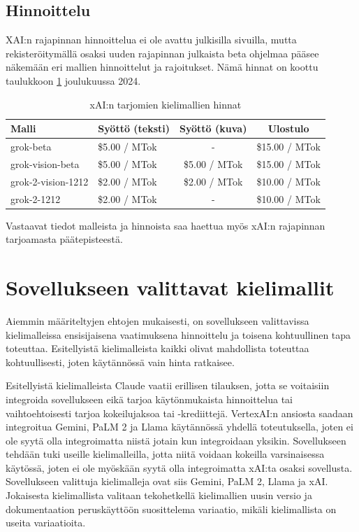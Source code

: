 \subsection{Hinnoittelu}

XAI:n rajapinnan hinnoittelua ei ole avattu julkisilla sivuilla, mutta
rekisteröitymällä osaksi uuden rajapinnan julkaista beta ohjelmaa pääsee
näkemään eri mallien hinnoittelut ja rajoitukset. Nämä hinnat on koottu
taulukkoon \ref{tab:grok-prices} joulukuussa 2024.

\begin{table}[H]
    \centering
    \caption{xAI:n tarjomien kielimallien hinnat}
    \label{tab:grok-prices}
    \begin{tabular}{llcc}
        \textbf{Malli} & \textbf{Syöttö (teksti)} & \textbf{Syöttö (kuva)} & \textbf{Ulostulo} \\
        \hline
        grok-beta          & \$5.00 / MTok &             - & \$15.00 / MTok \\
        grok-vision-beta   & \$5.00 / MTok & \$5.00 / MTok & \$15.00 / MTok \\
        grok-2-vision-1212 & \$2.00 / MTok & \$2.00 / MTok & \$10.00 / MTok \\
        grok-2-1212        & \$2.00 / MTok &             - & \$10.00 / MTok \\
        \hline
    \end{tabular}
\end{table}

Vastaavat tiedot malleista ja hinnoista saa haettua myös xAI:n rajapinnan
tarjoamasta päätepisteestä. \parencite{xAIDocsEndpoints}

\section{Sovellukseen valittavat kielimallit}

Aiemmin määriteltyjen ehtojen mukaisesti, on sovellukseen valittavissa
kielimalleissa ensisijaisena vaatimuksena hinnoittelu ja toisena kohtuullinen
tapa toteuttaa. Esitellyistä kielimalleista kaikki olivat mahdollista toteuttaa
kohtuullisesti, joten käytännössä vain hinta ratkaisee.

Esitellyistä kielimalleista Claude vaatii erillisen tilauksen, jotta se
voitaisiin integroida sovellukseen eikä tarjoa käytönmukaista hinnoittelua tai
vaihtoehtoisesti tarjoa kokeilujaksoa tai -krediittejä. VertexAI:n ansiosta
saadaan integroitua Gemini, PaLM 2 ja Llama käytännössä yhdellä toteutuksella,
joten ei ole syytä olla integroimatta niistä jotain kun integroidaan yksikin.
Sovellukseen tehdään tuki useille kielimalleilla, jotta niitä voidaan kokeilla
varsinaisessa käytössä, joten ei ole myöskään syytä olla integroimatta xAI:ta
osaksi sovellusta. Sovellukseen valittuja kielimalleja ovat siis Gemini,
PaLM 2, Llama ja xAI. Jokaisesta kielimallista valitaan tekohetkellä
kielimallien uusin versio ja dokumentaation peruskäyttöön suosittelema
variaatio, mikäli kielimallista on useita variaatioita.
